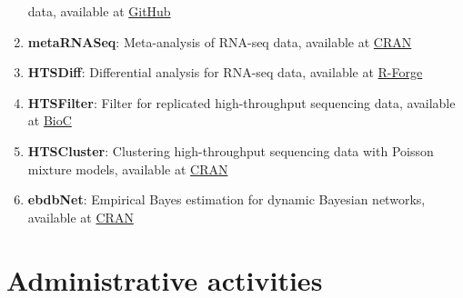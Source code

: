 \documentclass[11pt, a4paper]{awesome-cv}
\begin{document}
\begin{enumerate}
  data, available at \href{https://github.com/Gallopin/ICAL}{GitHub}\\
\item
  \textbf{metaRNASeq}: Meta-analysis of RNA-seq data, available at
  \href{https://cran.r-project.org/web/packages/metaRNASeq/index.html}{CRAN}\\
\item
  \textbf{HTSDiff}: Differential analysis for RNA-seq data, available at
  \href{https://r-forge.r-project.org/R/?group_id=1504}{R-Forge}\\
\item
  \textbf{HTSFilter}: Filter for replicated high-throughput sequencing
  data, available at
  \href{http://www.bioconductor.org/packages/release/bioc/html/HTSFilter.html}{BioC}\\
\item
  \textbf{HTSCluster}: Clustering high-throughput sequencing data with
  Poisson mixture models, available at
  \href{http://cran.r-project.org/web/packages/HTSCluster}{CRAN}\\
\item
  \textbf{ebdbNet}: Empirical Bayes estimation for dynamic Bayesian
  networks, available at
  \href{http://cran.r-project.org/web/packages/ebdbNet}{CRAN}
\end{enumerate}

\hypertarget{administrative-activities}{%
\section{Administrative activities}\label{administrative-activities}}
\end{document}
